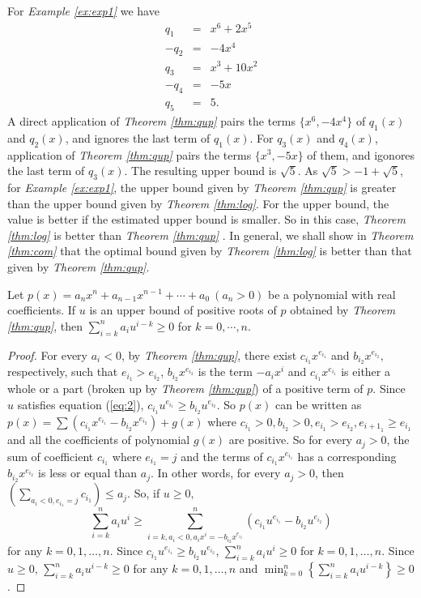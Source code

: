 For {\em Example \ref{ex:exp1}} we have
  \begin{eqnarray*}
 q_1&=&x^6+2x^5\\  	
 -q_2&=& -4x^4\\
 q_3&=& x^3+10x^2\\
 -q_4&=& -5x\\
 q_5&=&5.
  	\end{eqnarray*}
A direct application of {\em Theorem \ref{thm:qup}} pairs the terms $\{x^6, -4x^4\}$ of $q_1(x)$ and $q_2(x)$, and ignores the last term
  	of $q_1(x)$. For $q_3(x)$ and $q_4(x)$,   application of {\em Theorem \ref{thm:qup}} pairs the terms $\{x^3, -5x\}$ of them, and igonores the last  term of $q_3(x)$. The resulting upper bound is $\sqrt{5}$. As $\sqrt{5}> -1+\sqrt{5}$, for {\em Example \ref{ex:exp1}}, the upper bound given by {\em Theorem \ref{thm:qup}} is greater than  the upper bound given by {\em Theorem \ref{thm:log}}. For the upper bound, the value is better if the estimated upper bound is smaller. So in this case,  {\em Theorem \ref{thm:log}}  is better than   {\em Theorem \ref{thm:qup}} . In general, we shall show in {\em Theorem \ref{thm:com}} that the optimal bound given by {\em Theorem \ref{thm:log}} is better than that given by {\em Theorem \ref{thm:qup}}.

\begin{theorem}\label{thm:com}
	Let $p(x)=a_nx^n+a_{n-1}x^{n-1}+\cdots+a_0\ (a_n>0)$ be a polynomial with real coefficients. If $u$ is an upper bound of positive roots of $p$ obtained by {\em Theorem \ref{thm:qup}}, then $  \sum_{i=k}^n a_i u^{i-k}\ge0$ for $k=0,\cdots, n$.
	
\end{theorem}
\begin{proof}

	For every $ a_i<0$, by {\em Theorem \ref{thm:qup}}, there exist  $c_{i_1}x^{e_{i_1}}$ and $b_{i_2}x^{e_{i_2}},$  respectively, such that
	$e_{i_1}>e_{i_2}$, $b_{i_2}x^{e_{i_2} }$ is the term $-a_ix^i$
	and $c_{i_1}x^{e_{i_1} }$ is either a whole or a part (broken up by {\em Theorem \ref{thm:qup}}) of a positive term of $p$. Since $u$ satisfies equation (\ref{eq:2}),
	 $c_{i_1}u^{e_{i_1}}\ge b_{i_2}u^{e_{i_2}}$.
So $p(x)$ can be written as $p(x)=\sum (c_{i_1}x^{e_{i_1}}-b_{i_2}x^{e_{i_2}})+g(x)$ where $c_{i_1}> 0,b_{i_2}>0,e_{i_1}> e_{i_2}, e_{{i+1}_1}\ge e_{i_1} $  and all the coefficients of polynomial $g(x)$ are positive.
	 So for  every  $a_j>0$, the sum of coefficient $c_{i_1}$ where  $e_{i_1}=j$ and  the terms of $c_{i_1}x^{e_{i_1}}$    has a corresponding $ b_{i_2}x^{e_{i_2}}$ is less or equal than $a_j$. In other words,
	for every  $a_j>0$,  then $\left( \sum_{a_i<0,e_{i_1}=j }c_{i_1} \right)\le a_{j}$. So, if $u\ge0,$
	\[\sum_{i=k}^na_iu^i\ge \sum_{i=k,a_i<0, a_ix^i=-b_{i_2}x^{e_{i_2}}  }^n \left( c_{i_1}u^{e_{i_1}}-
		b_{i_2}u^{e_{i_2}} \right) \] for any $k= 0,1,\ldots,n$.  Since  $c_{i_1}u^{e_{i_1}}\ge b_{i_2}u^{e_{i_2}}$, $\sum_{i=k}^na_iu^i\ge 0$ for
	 $k= 0,1,\ldots,n$. Since $u\ge0$,  $\sum_{i=k}^n a_i u^{i-k}\ge0 $ for any  $k= 0,1,\ldots,n$ and
	$\min_{k=0}^{n}\left\{  \sum_{i=k}^n a_i u^{i-k}\right\}\ge0$.
\end{proof}


